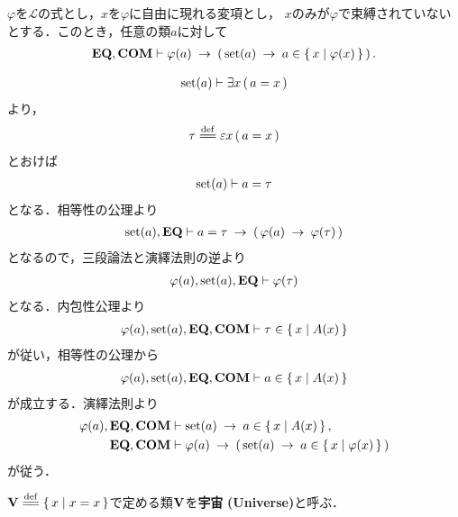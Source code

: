 	\begin{screen}
		\begin{thm}[条件を満たす集合は要素である]\label{thm:satisfactory_set_is_an_element}
			$\varphi$を$\mathcal{L}$の式とし，$x$を$\varphi$に自由に現れる変項とし，
			$x$のみが$\varphi$で束縛されていないとする．このとき，任意の類$a$に対して
			\begin{align}
				\mbox{{\bf EQ}},\mbox{\bf COM} \vdash \varphi(a) \hspace{0.25em}\rightarrow\hspace{0.25em} 
				\left(\, \operatorname*{set} (a) \hspace{0.25em}\rightarrow\hspace{0.25em} a \in \left\{\, x \mid \varphi(x)\, \right\}\, \right).
			\end{align}
		\end{thm}
	\end{screen}
	
	\begin{sketch}
		\begin{align}
			\operatorname*{set} (a) \vdash \exists x\, (\, a = x\, )
		\end{align}
		より，
		\begin{align}
			\tau \defeq \varepsilon x\, (\, a = x\, )
		\end{align}
		とおけば
		\begin{align}
			\operatorname*{set} (a) \vdash a = \tau
		\end{align}
		となる．相等性の公理より
		\begin{align}
			\operatorname*{set} (a),\mbox{{\bf EQ}} \vdash 
			a = \tau \hspace{0.25em}\rightarrow\hspace{0.25em} (\, \varphi(a) \hspace{0.25em}\rightarrow\hspace{0.25em} \varphi(\tau)\, )
		\end{align}
		となるので，三段論法と演繹法則の逆より
		\begin{align}
			\varphi(a),\operatorname*{set} (a),\mbox{{\bf EQ}} \vdash \varphi(\tau)
		\end{align}
		となる．内包性公理より
		\begin{align}
			\varphi(a),\operatorname*{set} (a),\mbox{{\bf EQ}},\mbox{\bf COM} \vdash \tau \in \left\{\, x \mid A(x)\, \right\}
		\end{align}
		が従い，相等性の公理から
		\begin{align}
			\varphi(a),\operatorname*{set} (a),\mbox{{\bf EQ}},\mbox{\bf COM} \vdash a \in \left\{\, x \mid A(x)\, \right\}
		\end{align}
		が成立する．演繹法則より
		\begin{align}
			\varphi(a),\mbox{{\bf EQ}},\mbox{\bf COM} &\vdash \operatorname*{set} (a) \hspace{0.25em}\rightarrow\hspace{0.25em} a \in \left\{\, x \mid A(x)\, \right\}, \\
			\mbox{{\bf EQ}},\mbox{\bf COM} &\vdash \varphi(a) \hspace{0.25em}\rightarrow\hspace{0.25em} 
			\left(\, \operatorname*{set} (a) \hspace{0.25em}\rightarrow\hspace{0.25em} a \in \left\{\, x \mid \varphi(x)\, \right\}\, \right)
		\end{align}
		が従う．
		\QED
	\end{sketch}
	
	\begin{screen}
		\begin{dfn}[宇宙]
			$\Univ \defeq \Set{x}{x=x}$で定める類$\mathbf{V}$を{\bf 宇宙}\index{うちゅう@宇宙}
			{\bf (Universe)}と呼ぶ．
		\end{dfn}
	\end{screen}
	
